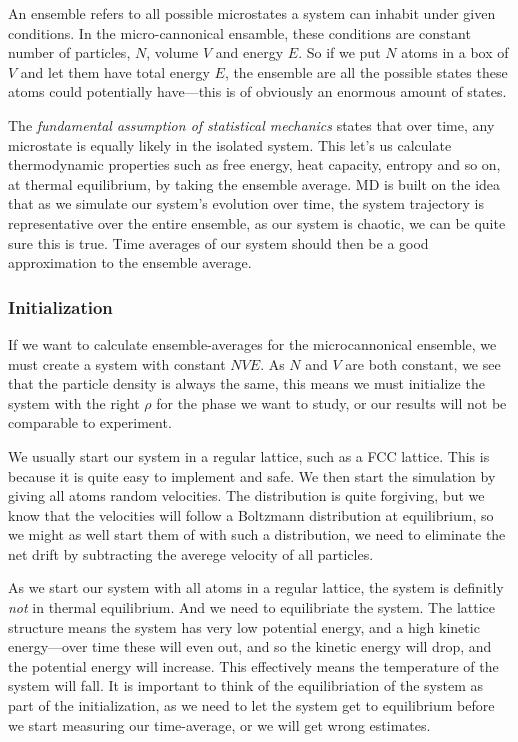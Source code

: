 \documentclass[a4paper, 11pt, notitlepage, english]{article}
\begin{document}
An ensemble refers to all possible microstates a system can inhabit under given conditions. In the micro-cannonical ensamble, these conditions are constant number of particles, $N$, volume $V$ and energy $E$. So if we put $N$ atoms in a box of $V$ and let them have total energy $E$, the ensemble are all the possible states these atoms could potentially have---this is of obviously an enormous amount of states. 

The \emph{fundamental assumption of statistical mechanics} states that over time, any microstate is equally likely in the isolated system. This let's us calculate thermodynamic properties such as free energy, heat capacity, entropy and so on, at thermal equilibrium, by taking the ensemble average. MD is built on the idea that as we simulate our system's evolution over time, the system trajectory is representative over the entire ensemble, as our system is chaotic, we can be quite sure this is true. Time averages of our system should then be a good approximation to the ensemble average.

\subsubsection*{Initialization}

If we want to calculate ensemble-averages for the microcannonical ensemble, we must create a system with constant $NVE$. As $N$ and $V$ are both constant, we see that the particle density is always the same, this means we must initialize the system with the right $\rho$ for the phase we want to study, or our results will not be comparable to experiment.

We usually start our system in a regular lattice, such as a FCC lattice. This is because it is quite easy to implement and safe. We then start the simulation by giving all atoms random velocities. The distribution is quite forgiving, but we know that the velocities will follow a Boltzmann distribution at equilibrium, so we might as well start them of with such a distribution, we need to eliminate the net drift by subtracting the averege velocity of all particles. 

As we start our system with all atoms in a regular lattice, the system is definitly \emph{not} in thermal equilibrium. And we need to equilibriate the system. The lattice structure means the system has very low potential energy, and a high kinetic energy---over time these will even out, and so the kinetic energy will drop, and the potential energy will increase. This effectively means the temperature of the system will fall. It is important to think of the equilibriation of the system as part of the initialization, as we need to let the system get to equilibrium before we start measuring our time-average, or we will get wrong estimates. 
\end{document}
